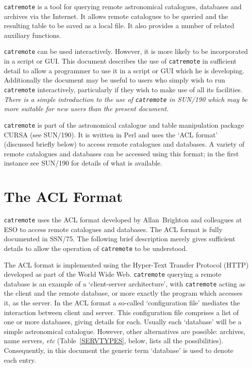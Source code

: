 \documentclass[twoside,11pt]{article}
\newcommand{\xref}[3]{#1}
\newcommand{\xlabel}[1]{}
\renewcommand{\_}{\texttt{\symbol{95}}}
\begin{document}
{\tt catremote} is a tool for querying remote astronomical catalogues,
databases and archives via the Internet.  It allows remote catalogues
to be queried and the resulting table to be saved as a local file.  It
also provides a number of related auxiliary functions.

{\tt catremote} can be used interactively.  However, it is more likely
to be incorporated in a script or GUI.  This document describes the use
of {\tt catremote} in sufficient detail to allow a programmer to use it
in a script or GUI which he is developing.  Additionally the document may
be useful to users who simply wish to run {\tt catremote} interactively,
particularly if they wish to make use of all its facilities.  {\it There
is a simple introduction to the use of {\tt catremote} in
\xref{SUN/190}{sun190}{}\cite{SUN190} which may be more suitable for new
users than the present document.}

{\tt catremote} is part of the astronomical catalogue and table
manipulation package CURSA (see \xref{SUN/190}{sun190}{}\cite{SUN190}).
It is written in Perl and uses the `ACL format' (discussed briefly below)
to access remote catalogues and databases.   A variety of remote
catalogues and databases can be accessed using this format; in the first
instance see SUN/190 for details of what is available.


\section{\xlabel{ACL}\label{ACL}The ACL Format}

{\tt catremote} uses the ACL format developed by Allan~Brighton and
colleagues at ESO to access remote catalogues and databases.  The ACL
format is fully documented in \xref{SSN/75}{ssn75}{}\cite{SSN75}.  The
following brief description merely gives sufficient details to allow the
operation of {\tt catremote} to be understood.

The ACL format is implemented using the Hyper-Text Transfer Protocol (HTTP)
developed as part of the World Wide Web.  {\tt catremote} querying a
remote database is an example of a `client-server architecture', with
{\tt catremote} acting as the client and the remote database, or more
exactly the program which accesses it, as the server.  In the ACL format
a so-called `configuration file' mediates the interaction between client
and server.  This configuration file comprises a list of one or more
databases, giving details for each.  Usually each `database' will be a
simple astronomical catalogue.  However, other alternatives are possible:
archives, name servers, \emph{etc}\/ (Table~\ref{SERVTYPES}, below, lists
all the possibilities).  Consequently, in this document the
generic term `database' is used to denote each entry.
\end{document}
